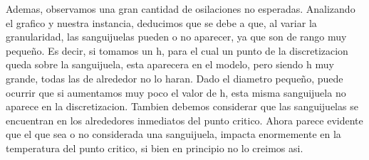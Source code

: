 Ademas, observamos una gran cantidad de osilaciones no esperadas. Analizando el grafico y nuestra instancia, deducimos que se debe a que, al variar la granularidad, las sanguijuelas pueden o no aparecer, ya que son de rango muy peque\~no. Es decir, si tomamos un h, para el cual un punto de la discretizacion queda sobre la sanguijuela, esta aparecera en el modelo, pero siendo h muy grande, todas las de alrededor no lo haran. Dado el diametro peque\~no, puede ocurrir que si aumentamos muy poco el valor de h, esta misma sanguijuela no aparece en la discretizacion. Tambien debemos considerar que las sanguijuelas se encuentran en los alrededores inmediatos del punto critico. Ahora parece evidente que el que sea o no considerada una sanguijuela, impacta enormemente en la temperatura del punto critico, si bien en principio no lo creimos asi.